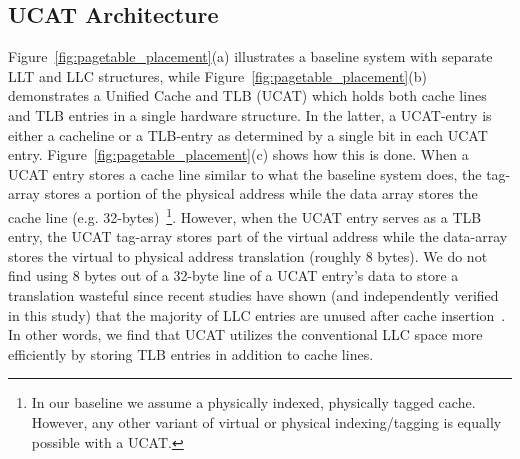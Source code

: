 
\subsection{UCAT Architecture}

\noindent 
Figure~\ref{fig:pagetable_placement}(a) illustrates a baseline system
with separate LLT and LLC structures, while Figure~\ref{fig:pagetable_placement}(b)
demonstrates a Unified Cache and TLB (UCAT) which holds both cache lines and
TLB entries in a single hardware structure. In the latter, a UCAT-entry is
either a cacheline or a TLB-entry as determined by a single bit in
each UCAT entry. Figure~\ref{fig:pagetable_placement}(c) shows how this is done. 
When a UCAT entry stores a cache line similar to what the baseline system does,
the tag-array stores a portion of the physical address while the data array stores
the cache line (e.g. 32-bytes)~\footnote{In our baseline we assume
a physically indexed, physically tagged cache. However, any other variant of
virtual or physical indexing/tagging is equally possible with a UCAT.}. 
However, when the UCAT entry serves as
a TLB entry, the UCAT tag-array stores part of the virtual address while the
data-array stores the virtual to physical address translation (roughly
8 bytes). We do not find using 8 bytes out of a 32-byte line of a UCAT entry's data to
store a translation wasteful since recent studies have shown (and independently
verified in this study) that the majority of LLC entries are unused
after cache insertion~\cite{}. In other words, we find that UCAT utilizes
the conventional LLC space more efficiently by storing TLB entries in addition to cache
lines.




